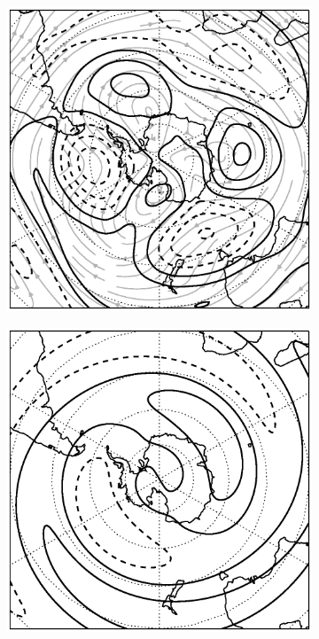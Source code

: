 \begin{figure}
\centering
\begin{subfigure}[c]{0.617\textwidth}
\includegraphics[width=\textwidth]{figures/zonalwaves/Figure1-1a.eps}
\end{subfigure}\qquad
\begin{subfigure}[c]{0.289\textwidth}
\includegraphics[width=\textwidth]{figures/zonalwaves/Figure1-1b.eps}


\end{subfigure}
\end{figure}
